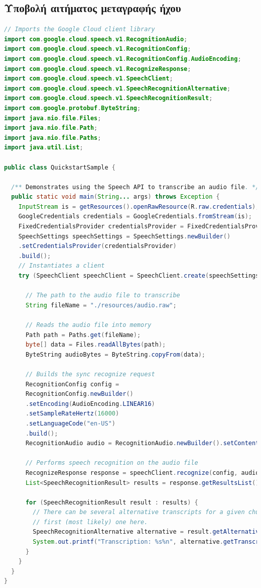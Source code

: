 \documentclass[oneside, 12pt]{book}
\begin{document}
\subsection{Υποβολή αιτήματος μεταγραφής ήχου}
\begin{lstlisting}[language=java]
// Imports the Google Cloud client library
import com.google.cloud.speech.v1.RecognitionAudio;
import com.google.cloud.speech.v1.RecognitionConfig;
import com.google.cloud.speech.v1.RecognitionConfig.AudioEncoding;
import com.google.cloud.speech.v1.RecognizeResponse;
import com.google.cloud.speech.v1.SpeechClient;
import com.google.cloud.speech.v1.SpeechRecognitionAlternative;
import com.google.cloud.speech.v1.SpeechRecognitionResult;
import com.google.protobuf.ByteString;
import java.nio.file.Files;
import java.nio.file.Path;
import java.nio.file.Paths;
import java.util.List;

public class QuickstartSample {

  /** Demonstrates using the Speech API to transcribe an audio file. */
  public static void main(String... args) throws Exception {
    InputStream is = getResources().openRawResource(R.raw.credentials);
    GoogleCredentials credentials = GoogleCredentials.fromStream(is);
    FixedCredentialsProvider credentialsProvider = FixedCredentialsProvider.create(credentials);
    SpeechSettings speechSettings = SpeechSettings.newBuilder()
    .setCredentialsProvider(credentialsProvider)
    .build();
    // Instantiates a client
    try (SpeechClient speechClient = SpeechClient.create(speechSettings)) {

      // The path to the audio file to transcribe
      String fileName = "./resources/audio.raw";

      // Reads the audio file into memory
      Path path = Paths.get(fileName);
      byte[] data = Files.readAllBytes(path);
      ByteString audioBytes = ByteString.copyFrom(data);

      // Builds the sync recognize request
      RecognitionConfig config =
      RecognitionConfig.newBuilder()
      .setEncoding(AudioEncoding.LINEAR16)
      .setSampleRateHertz(16000)
      .setLanguageCode("en-US")
      .build();
      RecognitionAudio audio = RecognitionAudio.newBuilder().setContent(audioBytes).build();

      // Performs speech recognition on the audio file
      RecognizeResponse response = speechClient.recognize(config, audio);
      List<SpeechRecognitionResult> results = response.getResultsList();

      for (SpeechRecognitionResult result : results) {
        // There can be several alternative transcripts for a given chunk of speech. Just use the
        // first (most likely) one here.
        SpeechRecognitionAlternative alternative = result.getAlternativesList().get(0);
        System.out.printf("Transcription: %s%n", alternative.getTranscript());
      }
    }
  }
}
\end{lstlisting}
\end{document}
